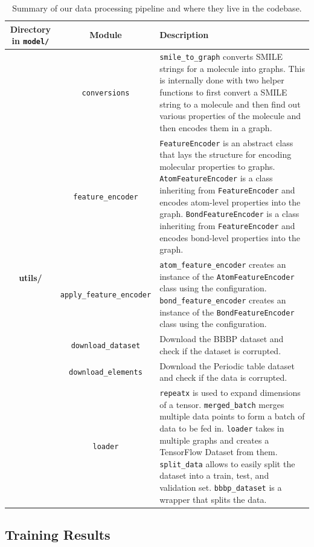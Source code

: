 \documentclass[fontsize=11pt]{article}
\begin{document}
\begin{table}[ht]
\centering
\caption{Summary of our data processing pipeline and where they live in the codebase.}
\label{tab:dataprocess}
\begin{tabularx}{\textwidth}{ccX}
\toprule
\textbf{Directory in \texttt{model/}} & \textbf{Module} & \textbf{Description}\\
\midrule
\multirow{16}{*}{\textbf{utils/}} & \texttt{conversions} & \texttt{smile\_to\_graph} converts SMILE strings for a molecule into graphs. This is internally done with two helper functions to first convert a SMILE string to a molecule and then find out various properties of the molecule and then encodes them in a graph.\\
&\texttt{feature\_encoder}& \texttt{FeatureEncoder} is an abstract class that lays the structure for encoding molecular properties to graphs. \texttt{AtomFeatureEncoder} is a class inheriting from \texttt{FeatureEncoder} and encodes atom-level properties into the graph. \texttt{BondFeatureEncoder} is a class inheriting from \texttt{FeatureEncoder} and encodes bond-level properties into the graph.\\
&\texttt{apply\_feature\_encoder}& \texttt{atom\_feature\_encoder} creates an instance of the \texttt{AtomFeatureEncoder} class using the configuration. \texttt{bond\_feature\_encoder} creates an instance of the \texttt{BondFeatureEncoder} class using the configuration.\\
\midrule
\multirow{8}{*}{\textbf{dataset/}} & \texttt{download\_dataset} & Download the BBBP dataset and check if the dataset is corrupted.\\
&\texttt{download\_elements}& Download the Periodic table dataset and check if the data is corrupted.\\
&\texttt{loader}& \texttt{repeatx} is used to expand dimensions of a tensor. \texttt{merged\_batch} merges multiple data points to form a batch of data to be fed in. \texttt{loader} takes in multiple graphs and creates a TensorFlow Dataset from them. \texttt{split\_data} allows to easily split the dataset into a train, test, and validation set. \texttt{bbbp\_dataset} is a wrapper that splits the data.\\
\bottomrule
\end{tabularx}
\end{table}

\subsection*{Training Results}
\end{document}
